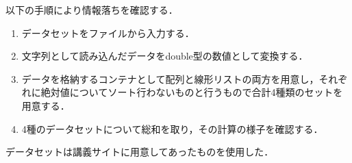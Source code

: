 以下の手順により情報落ちを確認する．
\begin{enumerate}
\item データセットをファイルから入力する．
\item 文字列として読み込んだデータをdouble型の数値として変換する．
\item データを格納するコンテナとして配列と線形リストの両方を用意し，それぞれに絶対値についてソート行わないものと行うもので合計4種類のセットを用意する．
\item 4種のデータセットについて総和を取り，その計算の様子を確認する．
\end{enumerate}
データセットは講義サイトに用意してあったものを使用した．
